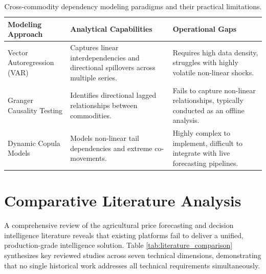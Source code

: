 \documentclass[12pt,a4paper]{report}
\theoremstyle{definition}
\theoremstyle{remark}
\begin{document}
\begin{table}[htbp]
\centering
\caption{Cross-commodity dependency modeling paradigms and their practical limitations.}
\label{tab:cross_commodity_comparison}
\begin{tabular}{p{3.5cm}|p{5.5cm}|p{5.5cm}}
\hline
\textbf{Modeling Approach} & \textbf{Analytical Capabilities} & \textbf{Operational Gaps} \\
\hline
Vector Autoregression (VAR) & Captures linear interdependencies and directional spillovers across multiple series. & Requires high data density, struggles with highly volatile non-linear shocks. \\
\hline
Granger Causality Testing & Identifies directional lagged relationships between commodities. & Fails to capture non-linear relationships, typically conducted as an offline analysis. \\
\hline
Dynamic Copula Models & Models non-linear tail dependencies and extreme co-movements. & Highly complex to implement, difficult to integrate with live forecasting pipelines. \\
\hline
\end{tabular}
\end{table}

\section{Comparative Literature Analysis}

A comprehensive review of the agricultural price forecasting and decision intelligence literature reveals that existing platforms fail to deliver a unified, production-grade intelligence solution. Table \ref{tab:literature_comparison} synthesizes key reviewed studies across seven technical dimensions, demonstrating that no single historical work addresses all technical requirements simultaneously.
\end{document}
